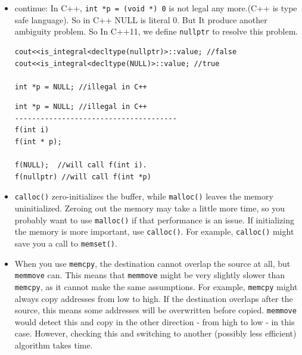 \documentclass[a4paper,11pt,twoside]{book}
\begin{document}
\begin{itemize}
	\item continue: In C++, \texttt{int *p = (void *) 0} is not legal any more.(C++ is type safe language).  So in C++ NULL is literal 0. But It produce another ambiguity problem.  So In C++11, we define \texttt{nullptr} to resolve this problem.
\begin{lstlisting}[numbers=none]
cout<<is_integral<decltype(nullptr)>::value; //false
cout<<is_integral<decltype(NULL)>::value; //true

int *p = NULL; //illegal in C++
\end{lstlisting}

	
\begin{lstlisting}[numbers=none]
int *p = NULL; //illegal in C++
--------------------------------------
f(int i)
f(int * p);

f(NULL);  //will call f(int i).
f(nullptr) //will call f(int *p)
\end{lstlisting}
	
	\item \texttt{calloc()} zero-initializes the buffer, while \texttt{malloc()} leaves the memory uninitialized. Zeroing out the memory may take a little more time, so you probably want to use \texttt{malloc()} if that performance is an issue. If initializing the memory is more important, use \texttt{calloc()}. For example, \texttt{calloc()} might save you a call to \texttt{memset()}.
	
	\item When you use \texttt{memcpy}, the destination cannot overlap the source at all, but \texttt{memmove} can. This means that \texttt{memmove} might be very slightly slower than \texttt{memcpy}, as it cannot make the same assumptions. For example, \texttt{memcpy} might always copy addresses from low to high. If the destination overlaps after the source, this means some addresses will be overwritten before copied. \texttt{memmove} would detect this and copy in the other direction - from high to low - in this case. However, checking this and switching to another (possibly less efficient) algorithm takes time.
\end{itemize}
\end{document}
